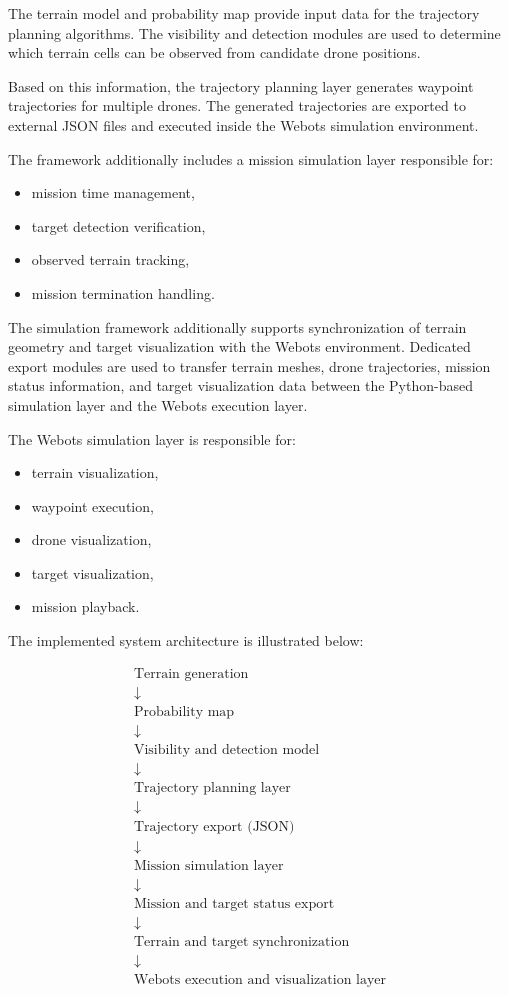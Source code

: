 \documentclass[english]{projectreport}
\begin{document}
The terrain model and probability map provide input data for the trajectory planning algorithms. The visibility and detection modules are used to determine which terrain cells can be observed from candidate drone positions.

Based on this information, the trajectory planning layer generates waypoint trajectories for multiple drones. The generated trajectories are exported to external JSON files and executed inside the Webots simulation environment.

The framework additionally includes a mission simulation layer responsible for:
\begin{itemize}
    \item mission time management,
    \item target detection verification,
    \item observed terrain tracking,
    \item mission termination handling.
\end{itemize}

The simulation framework additionally supports synchronization of terrain geometry and target visualization with the Webots environment. Dedicated export modules are used to transfer terrain meshes, drone trajectories, mission status information, and target visualization data between the Python-based simulation layer and the Webots execution layer.

The Webots simulation layer is responsible for:
\begin{itemize}
    \item terrain visualization,
    \item waypoint execution,
    \item drone visualization,
    \item target visualization,
    \item mission playback.
\end{itemize}

The implemented system architecture is illustrated below:

\[
\begin{array}{c}
\text{Terrain generation} \\
\downarrow \\
\text{Probability map} \\
\downarrow \\
\text{Visibility and detection model} \\
\downarrow \\
\text{Trajectory planning layer} \\
\downarrow \\
\text{Trajectory export (JSON)} \\
\downarrow \\
\text{Mission simulation layer} \\
\downarrow \\
\text{Mission and target status export} \\
\downarrow \\
\text{Terrain and target synchronization} \\
\downarrow \\
\text{Webots execution and visualization layer}
\end{array}
\]
\end{document}
